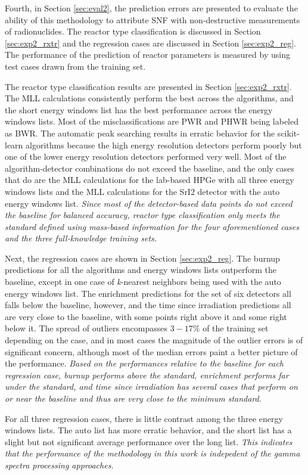 Fourth, in Section \ref{sec:eval2}, the prediction errors are presented to
evaluate the ability of this methodology to attribute \gls{SNF} with
non-destructive measurements of radionuclides. The reactor type classification
is discussed in Section \ref{sec:exp2_rxtr} and the regression cases are
discussed in Section \ref{sec:exp2_reg}.  The performance of the prediction of
reactor parameters is measured by using test cases drawn from the training set.

The reactor type classification results are presented in Section
\ref{sec:exp2_rxtr}.  The \gls{MLL} calculations consistently perform the best
across the algorithms, and the short energy windows list has the best
performance across the energy windows lists.  Most of the misclassifications
are \gls{PWR} and \gls{PHWR} being labeled as \gls{BWR}.  The automatic peak
searching results in erratic behavior for the scikit-learn algorithms because
the high energy resolution detectors perform poorly but one of the lower energy
resolution detectors performed very well. Most of the algorithm-detector
combinations do not exceed the baseline, and the only cases that do are the
\gls{MLL} calculations for the lab-based \gls{HPGe} with all three energy
windows lists and the \gls{MLL} calculations for the \gls{SrI2} detector with
the auto energy windows list. \textit{Since most of the detector-based data
points do not exceed the baseline for balanced accuracy, reactor type
classification only meets the standard defined using mass-based information for
the four aforementioned cases and the three full-knowledge training sets.}

Next, the regression cases are shown in Section \ref{sec:exp2_reg}.  The burnup
predictions for all the algorithms and energy windows lists outperform the
baseline, except in one case of \textit{k}-nearest neighbors being used with
the auto energy windows list.  The enrichment predictions for the set of six
detectors all falls below the baseline, however, and the time since irradiation
predictions all are very close to the baseline, with some points right above it
and some right below it.  The spread of outliers encompasses $3-17\%$ of the
training set depending on the case, and in most cases the magnitude of the
outlier errors is of significant concern, although most of the median errors
paint a better picture of the performance.  \textit{Based on the performances
relative to the baseline for each regression case, burnup performs above the
standard, enrichment performs far under the standard, and time since
irradiation has several cases that perform on or near the baseline and thus are
very close to the minimum standard.}

For all three regression cases, there is little contrast among the three energy
windows lists. The auto list has more erratic behavior, and the short list has
a slight but not significant average performance over the long list.
\textit{This indicates that the performance of the methodology in this work is
indepedent of the gamma spectra processing approaches.}

